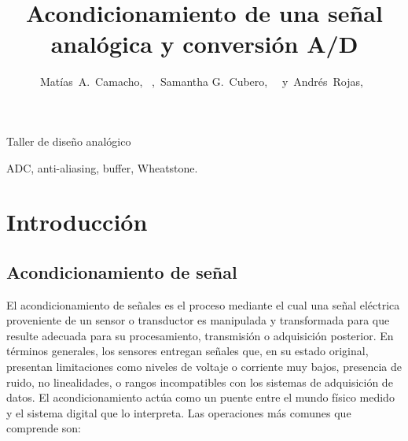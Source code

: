 \documentclass[journal, onecolumn]{IEEEtran}
\begin{document}
\setlength{\parindent}{4.2mm}
%
\title{Acondicionamiento de una señal analógica y conversión A/D}


\author{Matías~A.~Camacho,~
        ,~Samantha G.~Cubero,~
        ~y~Andrés~Rojas,~
}

%
{Taller de diseño analógico}


\maketitle




\clearpage
\tableofcontents
\clearpage

\begin{IEEEkeywords}
ADC, anti-aliasing, buffer, Wheatstone.
\end{IEEEkeywords}


\section{Introducción}



\subsection{Acondicionamiento de señal}
El acondicionamiento de señales es el proceso mediante el cual una señal eléctrica proveniente de un sensor o transductor es manipulada y transformada para que resulte adecuada para su procesamiento, transmisión o adquisición posterior.
En términos generales, los sensores entregan señales que, en su estado original, presentan limitaciones como niveles de voltaje o corriente muy bajos, presencia de ruido, no linealidades, o rangos incompatibles con los sistemas de adquisición de datos. El acondicionamiento actúa como un puente entre el mundo físico medido y el sistema digital que lo interpreta. 
Las operaciones más comunes que comprende son:
\end{document}
